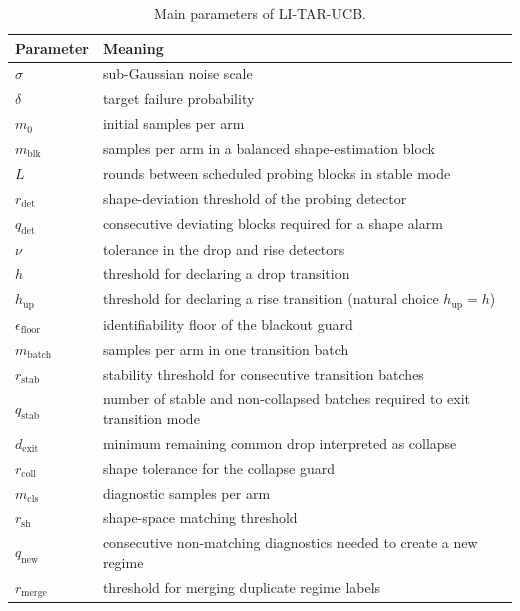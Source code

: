 \documentclass[11pt]{article}
\begin{document}
\begin{table}[h]
\centering
\begin{tabular}{ll}
\toprule
Parameter & Meaning \\
\midrule
$\sigma$ & sub-Gaussian noise scale \\
$\delta$ & target failure probability \\
$m_0$ & initial samples per arm \\
$m_{\mathrm{blk}}$ & samples per arm in a balanced shape-estimation block \\
$L$ & rounds between scheduled probing blocks in stable mode \\
$r_{\mathrm{det}}$ & shape-deviation threshold of the probing detector \\
$q_{\mathrm{det}}$ & consecutive deviating blocks required for a shape alarm \\
$\nu$ & tolerance in the drop and rise detectors \\
$h$ & threshold for declaring a drop transition \\
$h_{\mathrm{up}}$ & threshold for declaring a rise transition (natural choice $h_{\mathrm{up}}=h$) \\
$\epsilon_{\mathrm{floor}}$ & identifiability floor of the blackout guard \\
$m_{\mathrm{batch}}$ & samples per arm in one transition batch \\
$r_{\mathrm{stab}}$ & stability threshold for consecutive transition batches \\
$q_{\mathrm{stab}}$ & number of stable and non-collapsed batches required to exit transition mode \\
$d_{\mathrm{exit}}$ & minimum remaining common drop interpreted as collapse \\
$r_{\mathrm{coll}}$ & shape tolerance for the collapse guard \\
$m_{\mathrm{cls}}$ & diagnostic samples per arm \\
$r_{\mathrm{sh}}$ & shape-space matching threshold \\
$q_{\mathrm{new}}$ & consecutive non-matching diagnostics needed to create a new regime \\
$r_{\mathrm{merge}}$ & threshold for merging duplicate regime labels \\
\bottomrule
\end{tabular}
\caption{Main parameters of LI-TAR-UCB.}
\label{tab:parameters}
\end{table}
\end{document}
